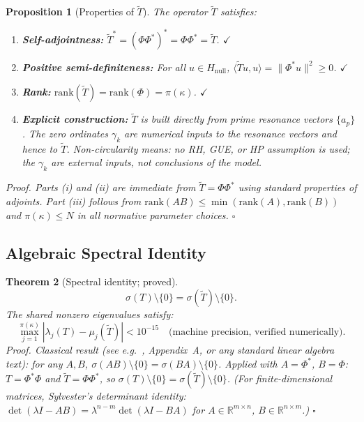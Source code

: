 \documentclass[11pt]{article}
\newtheorem{theorem}{Theorem}[section]
\newtheorem{proposition}[theorem]{Proposition}
\newcommand{\Hnull}{H_{\mathrm{null}}}
\newcommand{\Tt}{\widetilde{T}}
\begin{document}
\begin{proposition}[Properties of $\Tt$]\label{prop:Tt-properties}
The operator $\Tt$ satisfies:
\begin{enumerate}[label=(\roman*)]
	\item \textbf{Self-adjointness:}
	$\Tt^* = (\Phi\Phi^*)^* = \Phi\Phi^* = \Tt$. $\checkmark$
	\item \textbf{Positive semi-definiteness:}
	For all $u\in\Hnull$,
	$\langle\Tt u,u\rangle = \|\Phi^* u\|^2 \geq 0$. $\checkmark$
	\item \textbf{Rank:}
	$\mathrm{rank}(\Tt) = \mathrm{rank}(\Phi) = \pi(\kappa)$. $\checkmark$
	\item \textbf{Explicit construction:}
	$\Tt$ is built directly from prime resonance vectors $\{a_p\}$.
	The zero ordinates $\gamma_k$ are numerical inputs to the
	resonance vectors  and hence to $\Tt$.
	Non-circularity means: no RH, GUE, or HP assumption is used;
	the $\gamma_k$ are external inputs, not conclusions of the model.
\end{enumerate}
\emph{Proof.}
Parts (i) and (ii) are immediate from $\Tt=\Phi\Phi^*$ using standard
properties of adjoints.
Part (iii) follows from
$\mathrm{rank}(AB)\leq\min(\mathrm{rank}(A),\mathrm{rank}(B))$
and $\pi(\kappa)\leq N$ in all normative parameter choices. $\square$
\end{proposition}

\subsection{Algebraic Spectral Identity}

\begin{theorem}[Spectral identity; proved]\label{thm:spectral-identity}
\[
\sigma(T)\setminus\{0\} = \sigma(\Tt)\setminus\{0\}.
\]
The shared nonzero eigenvalues satisfy:
\[
\max_{j=1}^{\pi(\kappa)}|\lambda_j(T) - \mu_j(\Tt)| < 10^{-15}
\quad\text{(machine precision, verified numerically)}.
\]
\emph{Proof.}
Classical result (see e.g.\ \cite{IwaniecKowalski}, Appendix~A,
or any standard linear algebra text): for any $A,B$,
$\sigma(AB)\setminus\{0\} = \sigma(BA)\setminus\{0\}$.
Applied with $A=\Phi^*$, $B=\Phi$: $T=\Phi^*\Phi$ and
$\Tt=\Phi\Phi^*$, so $\sigma(T)\setminus\{0\}=\sigma(\Tt)\setminus\{0\}$.
(For finite-dimensional matrices, Sylvester's determinant identity:
$\det(\lambda I - AB) = \lambda^{n-m}\det(\lambda I-BA)$
for $A\in\mathbb{R}^{m\times n}$, $B\in\mathbb{R}^{n\times m}$.) $\square$
\end{theorem}
\end{document}
